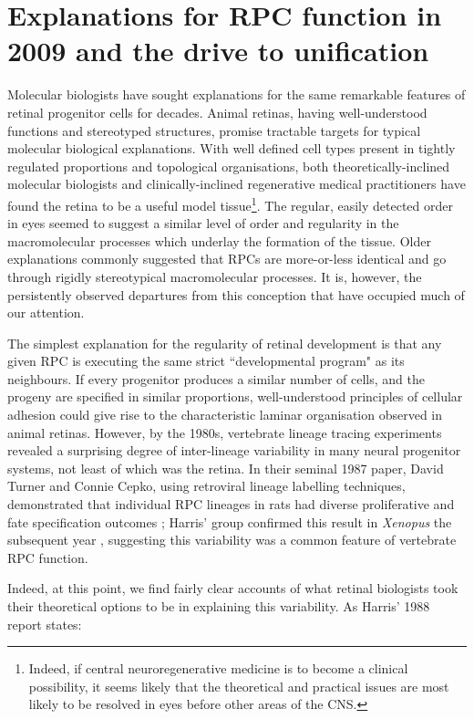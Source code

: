 \section{Explanations for RPC function in 2009 and the drive to unification}
\label{sec:TheoryOptions}
Molecular biologists have sought explanations for the same remarkable features of retinal progenitor cells for decades. Animal retinas, having well-understood functions and stereotyped structures, promise tractable  targets for typical molecular biological explanations. With well defined cell types present in tightly regulated proportions and topological organisations, both theoretically-inclined molecular biologists and clinically-inclined regenerative medical practitioners have found the retina to be a useful model tissue\footnote{Indeed, if central neuroregenerative medicine is to become a clinical possibility, it seems likely that the theoretical and practical issues are most likely to be resolved in eyes before other areas of the CNS.}. The regular, easily detected order in eyes seemed to suggest a similar level of order and regularity in the macromolecular processes which underlay the formation of the tissue. Older explanations commonly suggested that RPCs are more-or-less identical and go through rigidly stereotypical macromolecular processes. It is, however, the persistently observed departures from this conception that have occupied much of our attention.

The simplest explanation for the regularity of retinal development is that any given RPC is executing the same strict ``developmental program" as its neighbours. If every progenitor produces a similar number of cells, and the progeny are specified in similar proportions, well-understood principles of cellular adhesion could give rise to the characteristic laminar organisation observed in animal retinas. However, by the 1980s, vertebrate lineage tracing experiments revealed a surprising degree of inter-lineage variability in many neural progenitor systems, not least of which was the retina. In their seminal 1987 paper, David Turner and Connie Cepko, using retroviral lineage labelling techniques, demonstrated that individual RPC lineages in rats had diverse proliferative and fate specification outcomes \cite{Turner1987}; Harris' group confirmed this result in \textit{Xenopus} the subsequent year \cite{Holt1988}, suggesting this variability was a common feature of vertebrate RPC function.

Indeed, at this point, we find fairly clear accounts of what retinal biologists took their theoretical options to be in explaining this variability. As Harris' 1988 report states:

